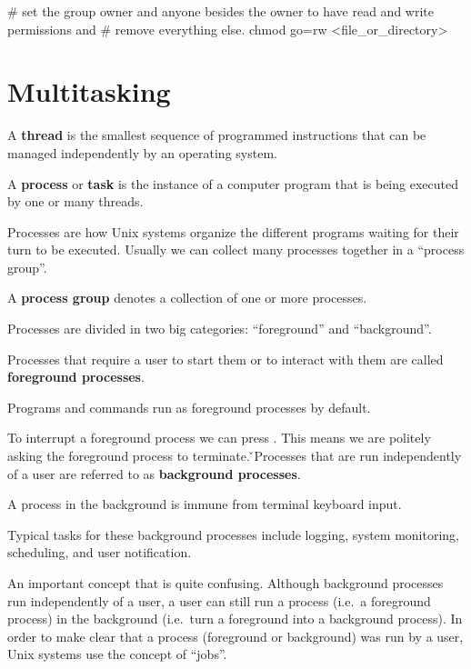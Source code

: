\begin{bash}
# set the group owner and anyone besides the owner to have read and write permissions and
# remove everything else.
chmod go=rw <file_or_directory>
\end{bash}
\ee

\section{Multitasking}

\bd[Thread]
A \textbf{thread} is the smallest sequence of programmed instructions that can be managed independently by an operating
system.
\ed

A \textbf{process} or \textbf{task} is the instance of a computer program that is being executed by one or many threads.
\ed

Processes are how Unix systems organize the different programs waiting for their turn to be executed. Usually we can
collect many processes together in a ``process group''.

A \textbf{process group} denotes a collection of one or more processes.
\ed

Processes are divided in two big categories: ``foreground'' and ``background''.

Processes that require a user to start them or to interact with them are called \textbf{foreground processes}.
\ed

\be
Programs and commands run as foreground processes by default.
\ee

To interrupt a foreground process we can press . This means we are politely asking the foreground process
to terminate. \v

Processes that are run independently of a user are referred to as \textbf{background processes}.
\ed

A process in the background is immune from terminal keyboard input.

\be
Typical tasks for these background processes include logging, system monitoring, scheduling, and user notification.
\ee

An important concept that is quite confusing. Although background processes run independently of a user, a user can
still run a process (i.e.\ a foreground process) in the background (i.e.\ turn a foreground into a background process).
In order to make clear that a process (foreground or background) was run by a user, Unix systems use the concept of
``jobs''.

